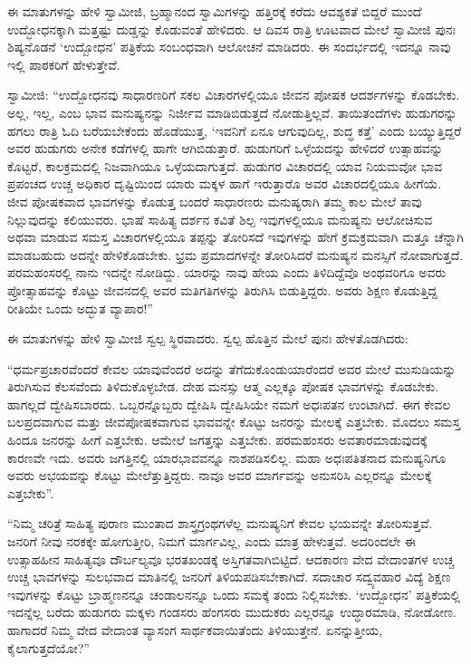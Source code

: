  ಈ ಮಾತುಗಳನ್ನು ಹೇಳಿ ಸ್ವಾಮೀಜಿ, ಬ್ರಹ್ಮಾನಂದ ಸ್ವಾಮಿಗಳನ್ನು ಹತ್ತಿರಕ್ಕೆ ಕರೆದು ಆವಶ್ಯಕತೆ ಬಿದ್ದರೆ ಮುಂದೆ ಉದ್ಭೋಧನಕ್ಕಾಗಿ ಮತ್ತಷ್ಟು ದುಡ್ಡನ್ನು ಕೊಡುವಂತೆ ಹೇಳಿದರು. ಆ ದಿವಸ ರಾತ್ರಿ ಊಟವಾದ ಮೇಲೆ ಸ್ವಾಮೀಜಿ ಪುನಃ ಶಿಷ್ಯನೊಡನೆ ‘ಉದ್ಬೋಧನ’ ಪತ್ರಿಕೆಯ ಸಂಬಂಧವಾಗಿ ಆಲೋಚನೆ ಮಾಡಿದರು. ಈ ಸಂದರ್ಭದಲ್ಲಿ ಇದನ್ನೂ ನಾವು ಇಲ್ಲಿ ಪಾಠಕರಿಗೆ ಹೇಳುತ್ತೇವೆ. 

 ಸ್ವಾಮೀಜಿ: “ಉದ್ಬೋಧನವು ಸಾಧಾರಣರಿಗೆ ಸಕಲ ವಿಚಾರಗಳಲ್ಲಿಯೂ ಜೀವನ ಪೋಷಕ ಆದರ್ಶಗಳನ್ನು ಕೊಡಬೇಕು. ಅಲ್ಲ, ಇಲ್ಲ, ಎಂಬ ಭಾವ ಮನುಷ್ಯನನ್ನು ನಿರ್ಜೀವ ಮಾಡಿಬಿಡುತ್ತದೆ ನೋಡುತ್ತಿಲ್ಲವೆ. ತಾಯಿತಂದೆಗಳು ಹುಡುಗರನ್ನು ಹಗಲು ರಾತ್ರಿ ಓದಿ ಬರೆಯಬೇಕೆಂದು ಹೊಡೆಯುತ್ತ, ‘ಇವನಿಗೆ ಏನೂ ಆಗುವುದಿಲ್ಲ, ಶುದ್ಧ ಕತ್ತೆ’ ಎಂದು ಬಯ್ಯುತ್ತಿದ್ದರೆ ಅವರ ಹುಡುಗರು ಅನೇಕ ಕಡೆಗಳಲ್ಲಿ ಹಾಗೇ ಆಗಿಬಿಡುತ್ತಾರೆ. ಹುಡುಗರಿಗೆ ಒಳ್ಳೆಯದನ್ನು ಹೇಳಿದರೆ ಉತ್ಸಾಹವನ್ನು ಕೊಟ್ಟರೆ, ಕಾಲಕ್ರಮದಲ್ಲಿ ನಿಜವಾಗಿಯೂ ಒಳ್ಳೆಯದಾಗುತ್ತದೆ. ಹುಡುಗರ ವಿಚಾರದಲ್ಲಿ ಯಾವ ನಿಯಮವೋ ಭಾವ ಪ್ರಪಂಚದ ಉಚ್ಚ ಅಧಿಕಾರ ದೃಷ್ಟಿಯಿಂದ ಯಾರು ಮಕ್ಕಳ ಹಾಗೆ ಇರುತ್ತಾರೊ ಅವರ ವಿಚಾರದಲ್ಲಿಯೂ ಹೀಗೆಯೆ. ಜೀವ ಪೋಷಕವಾದ ಭಾವಗಳನ್ನು ಕೊಡುತ್ತ ಬಂದರೆ ಸಾಧಾರಣರು ಮನುಷ್ಯರಾಗಿ ತಮ್ಮ ಕಾಲ ಮೇಲೆ ತಾವು ನಿಲ್ಲುವುದನ್ನು ಕಲಿಯುವರು. ಭಾಷೆ ಸಾಹಿತ್ಯ ದರ್ಶನ ಕವಿತೆ ಶಿಲ್ಪ ಇವುಗಳಲ್ಲಿಯೂ ಮನುಷ್ಯನು ಆಲೋಚಿಸುವ ಅಥವಾ ಮಾಡುವ ಸಮಸ್ತ ವಿಚಾರಗಳಲ್ಲಿಯೂ ತಪ್ಪನ್ನು ತೋರಿಸದೆ ಇವುಗಳನ್ನು ಹೇಗೆ ಕ್ರಮಕ್ರಮವಾಗಿ ಮತ್ತೂ ಚೆನ್ನಾಗಿ ಮಾಡಬಹುದು ಅದನ್ನೇ ಹೇಳಿಕೊಡಬೇಕು. ಭ್ರಮ ಪ್ರಮಾದಗಳನ್ನೇ ತೋರಿಸಿದರೆ ಮನುಷ್ಯನ ಮನಸ್ಸಿಗೆ ನೋವಾಗುತ್ತದೆ. ಪರಮಹಂಸರಲ್ಲಿ ನಾನು ಇದನ್ನೇ ನೋಡಿದ್ದು. ಯಾರನ್ನು ನಾವು ಹೇಯ ಎಂದು ತಿಳಿದಿದ್ದೆವೊ ಅಂಥವರಿಗೂ ಅವರು ಪ್ರೋತ್ಸಾಹವನ್ನು ಕೊಟ್ಟು ಜೀವನದಲ್ಲಿ ಅವರ ಮತಿಗತಿಗಳನ್ನು ತಿರುಗಿಸಿ ಬಿಡುತ್ತಿದ್ದರು. ಅವರು ಶಿಕ್ಷಣ ಕೊಡುತ್ತಿದ್ದ ರೀತಿಯೇ ಒಂದು ಅದ್ಭುತ ವ್ಯಾಪಾರ!” 

 ಈ ಮಾತುಗಳನ್ನು ಹೇಳಿ ಸ್ವಾಮೀಜಿ ಸ್ವಲ್ಪ ಸ್ಥಿರವಾದರು. ಸ್ವಲ್ಪ ಹೊತ್ತಿನ ಮೇಲೆ ಪುನಃ ಹೇಳತೊಡಗಿದರು: 

 “ಧರ್ಮಪ್ರಚಾರವೆಂದರೆ ಕೇವಲ ಯಾವುವೆಂದರೆ ಅದನ್ನು ತೆಗೆದುಕೊಂಡು\break ಯಾರೆಂದರೆ ಅವರ ಮೇಲೆ ಮುಸುಡಿಯನ್ನು ತಿರುಗಿಸುವ ಕೆಲಸವೆಂದು ತಿಳಿದುಕೊಳ್ಳಬೇಡ. ದೇಹ ಮನಸ್ಸು ಆತ್ಮ ಎಲ್ಲಕ್ಕೂ ಪೋಷಕ ಭಾವಗಳನ್ನು ಕೊಡಬೇಕು. ಹಾಗಲ್ಲದೆ ದ್ವೇಷಿಸಬಾರದು. ಒಬ್ಬರನ್ನೊಬ್ಬರು ದ್ವೇಷಿಸಿ ದ್ವೇಷಿಸಿಯೇ ನಮಗೆ ಅಧಃಪತನ ಉಂಟಾಗಿದೆ. ಈಗ ಕೇವಲ ಬಲಪ್ರದವಾಗುವ ಮತ್ತು ಜೀವಪೋಷಕವಾಗುವ ಭಾವವನ್ನೇ ಕೊಟ್ಟು ಜನರನ್ನು ಮೇಲಕ್ಕೆ ಎತ್ತಬೇಕು. ಮೊದಲು ಸಮಸ್ತ ಹಿಂದೂ ಜನರನ್ನು ಹೀಗೆ ಎತ್ತಬೇಕು. ಆಮೇಲೆ ಜಗತ್ತನ್ನು ಎತ್ತಬೇಕು. ಪರಮಹಂಸರು ಅವತಾರಮಾಡುವುದಕ್ಕೆ ಕಾರಣವೇ ಇದು. ಅವರು ಜಗತ್ತಿನಲ್ಲಿ ಯಾರಭಾವವನ್ನೂ ನಾಶಪಡಿಸಲಿಲ್ಲ. ಮಹಾ ಅಧಃಪತಿತನಾದ ಮನುಷ್ಯನಿಗೂ ಅವರು ಅಭಯವನ್ನು ಕೊಟ್ಟು ಮೇಲೆತ್ತುತ್ತಿದ್ದರು. ನಾವೂ ಅವರ ಮಾರ್ಗವನ್ನು ಅನುಸರಿಸಿ ಎಲ್ಲರನ್ನೂ ಮೇಲಕ್ಕೆ ಎತ್ತಬೇಕು”. 

 “ನಿಮ್ಮ ಚರಿತ್ರೆ ಸಾಹಿತ್ಯ ಪುರಾಣ ಮುಂತಾದ ಶಾಸ್ತ್ರಗ್ರಂಥಗಳೆಲ್ಲ ಮನುಷ್ಯನಿಗೆ ಕೇವಲ ಭಯವನ್ನೇ ತೋರಿಸುತ್ತವೆ. ಜನರಿಗೆ ನೀವು ನರಕಕ್ಕೇ ಹೋಗುತ್ತೀರಿ, ನಿಮಗೆ ಮಾರ್ಗವಿಲ್ಲ, ಎಂದು ಮಾತ್ರ ಹೇಳುತ್ತವೆ. ಅದರಿಂದಲೇ ಈ ಉತ್ಸಾಹಹೀನ ಸಾಹಿತ್ಯವೂ ದೌರ್ಬಲ್ಯವೂ ಭರತಖಂಡಕ್ಕೆ ಅಸ್ತಿಗತವಾಗಿಬಿಟ್ಟಿದೆ. ಆದಕಾರಣ ವೇದ ವೇದಾಂತಗಳ ಉಚ್ಚ ಉಚ್ಚ ಭಾವಗಳನ್ನು ಸುಲಭವಾದ ಮಾತಿನಲ್ಲಿ ಜನರಿಗೆ ತಿಳಿಯಪಡಿಸಬೇಕಾಗಿದೆ. ಸದಾಚಾರ ಸದ್ವ್ಯವಹಾರ ವಿದ್ಯೆ ಶಿಕ್ಷಣ ಇವುಗಳನ್ನು ಕೊಟ್ಟು ಬ್ರಾಹ್ಮಣನನ್ನೂ ಚಂಡಾಲನನ್ನೂ ಒಂದು ಸಮಕ್ಕೆ ತಂದು ನಿಲ್ಲಿಸಬೇಕು. ‘ಉದ್ಬೋಧನ' ಪತ್ರಿಕೆಯಲ್ಲಿ ಇದನ್ನೆಲ್ಲ ಬರೆದು ಹುಡುಗರು ಮಕ್ಕಳು ಗಂಡಸರು ಹೆಂಗಸರು ಮುದುಕರು ಎಲ್ಲರನ್ನೂ ಉದ್ಧಾರಮಾಡಿ, ನೋಡೋಣ. ಹಾಗಾದರೆ ನಿಮ್ಮ ವೇದ ವೇದಾಂತ ವ್ಯಾಸಂಗ ಸಾರ್ಥಕವಾಯಿತೆಂದು ತಿಳಿಯುತ್ತೇನೆ. ಏನನ್ನುತ್ತೀಯ, ಕೈಲಾಗುತ್ತದೆಯೋ?” 

